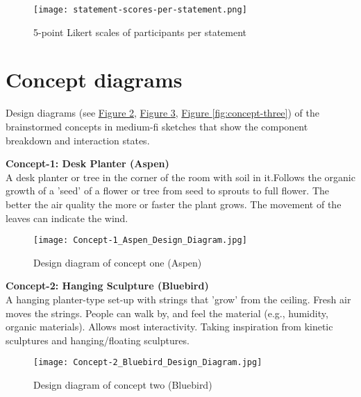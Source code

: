 \begin{appendices}
\begin{figure}[H]
    \centering
    \texttt{[image: statement-scores-per-statement.png]}
    \caption{5-point Likert scales of participants per statement}
    \label{fig:survey-statement-scores}
\end{figure}

\newpage

\section{Concept diagrams}
\label{appendix:conceptdiagrams}

Design diagrams (see \hyperref[fig:concept-one]{Figure \ref{fig:concept-one}}, \hyperref[fig:concept-two]{Figure \ref{fig:concept-two}}, \hyperref[fig:concept-three]{Figure \ref{fig:concept-three}}) of the brainstormed concepts in medium-fi sketches that show the component breakdown and interaction states.\\

\vspace{1em}

\textbf{Concept-1: Desk Planter (Aspen)}\\
A desk planter or tree in the corner of the room with soil in it.Follows the organic growth of a 'seed' of a flower or tree from seed to sprouts to full flower. The better the air quality the more or faster the plant grows. The movement of the leaves can indicate the wind.


\begin{figure}[H]
    \centering
    \texttt{[image: Concept-1\_Aspen\_Design\_Diagram.jpg]}
    \caption{Design diagram of concept one (Aspen)}
    \label{fig:concept-one}
\end{figure}

\textbf{Concept-2: Hanging Sculpture (Bluebird)}\\
A hanging planter-type set-up with strings that 'grow' from the ceiling. Fresh air moves the strings. People can walk by, and feel the material (e.g., humidity, organic materials). Allows most interactivity. Taking inspiration from kinetic sculptures and hanging/floating sculptures.

\begin{figure}[H]
    \centering
    \texttt{[image: Concept-2\_Bluebird\_Design\_Diagram.jpg]}
    \caption{Design diagram of concept two (Bluebird)}
    \label{fig:concept-two}
\end{figure}


\end{appendices}
